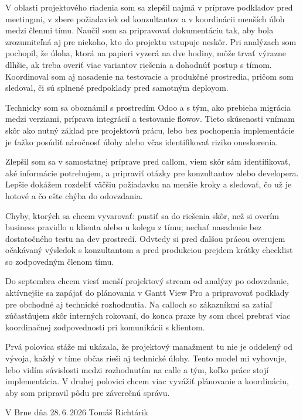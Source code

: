 \documentclass[12pt,a4paper]{article}
\begin{document}
V oblasti projektového riadenia som sa zlepšil najmä v príprave podkladov pred meetingmi, v zbere požiadaviek od konzultantov a v koordinácii menších úloh medzi členmi tímu. Naučil som sa pripravovať dokumentáciu tak, aby bola zrozumiteľná aj pre niekoho, kto do projektu vstupuje neskôr. Pri analýzach som pochopil, že úloha, ktorá na papieri vyzerá na dve hodiny, môže trvať výrazne dlhšie, ak treba overiť viac variantov riešenia a dohodnúť postup s tímom. Koordinoval som aj nasadenie na testovacie a produkčné prostredia, pričom som sledoval, či sú splnené predpoklady pred samotným deployom.

Technicky som sa oboznámil s prostredím Odoo a s tým, ako prebieha migrácia medzi verziami, príprava integrácií a testovanie flowov. Tieto skúsenosti vnímam skôr ako nutný základ pre projektovú prácu, lebo bez pochopenia implementácie je ťažko posúdiť náročnosť úlohy alebo včas identifikovať riziko oneskorenia.

Zlepšil som sa v samostatnej príprave pred callom, viem skôr sám identifikovať, aké informácie potrebujem, a pripraviť otázky pre konzultantov alebo developera. Lepšie dokážem rozdeliť väčšiu požiadavku na menšie kroky a sledovať, čo už je hotové a čo ešte chýba do odovzdania.

Chyby, ktorých sa chcem vyvarovať: pustiť sa do riešenia skôr, než si overím business pravidlo u klienta alebo u kolegu z tímu; nechať nasadenie bez dostatočného testu na dev prostredí. Odvtedy si pred ďalšou prácou overujem očakávaný výsledok s konzultantom a pred produkciou prejdem krátky checklist so zodpovedným členom tímu.

Do septembra chcem viesť menší projektový stream od analýzy po odovzdanie, aktívnejšie sa zapájať do plánovania v Gantt View Pro a pripravovať podklady pre obchodné aj technické rozhodnutia. Na calloch so zákazníkmi sa zatiaľ zúčastňujem skôr interných rokovaní, do konca praxe by som chcel prebrať viac koordinačnej zodpovednosti pri komunikácii s klientom.

Prvá polovica stáže mi ukázala, že projektový manažment tu nie je oddelený od vývoja, každý v tíme občas rieši aj technické úlohy. Tento model mi vyhovuje, lebo vidím súvislosti medzi rozhodnutím na calle a tým, koľko práce stojí implementácia. V druhej polovici chcem viac vyvážiť plánovanie a koordináciu, aby som pripravil pôdu pre záverečnú správu.

\vspace{1.5cm}
\noindent V Brne dňa 28.\,6.\,2026 \hfill Tomáš Richtárik
\end{document}
